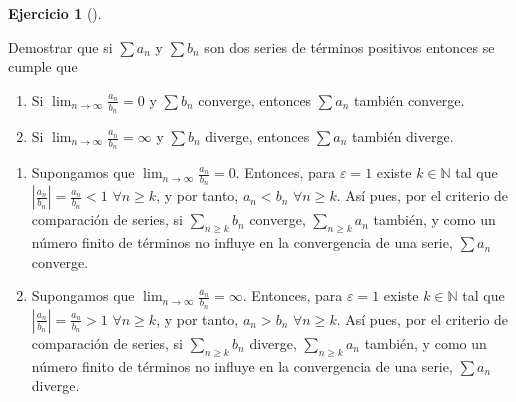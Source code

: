 \documentclass[
  spanish,
  a4paper,
]{scrreport}
\theoremstyle{definition}
\newtheorem{exercise}{Ejercicio}[chapter]
\theoremstyle{remark}
\begin{document}
\begin{exercise}[]\protect\hypertarget{exr-criterio-cociente}{}\label{exr-criterio-cociente}

Demostrar que si \(\sum a_n\) y \(\sum b_n\) son dos series de términos
positivos entonces se cumple que

\begin{enumerate}
\def\labelenumi{\alph{enumi}.}
\item
  Si \(\lim_{n\to\infty} \frac{a_n}{b_n} = 0\) y \(\sum b_n\) converge,
  entonces \(\sum a_n\) también converge.
\item
  Si \(\lim_{n\to\infty} \frac{a_n}{b_n} = \infty\) y \(\sum b_n\)
  diverge, entonces \(\sum a_n\) también diverge.
\end{enumerate}

\end{exercise}

\begin{tcolorbox}[enhanced jigsaw, arc=.35mm, bottomrule=.15mm, bottomtitle=1mm, breakable, colback=white, colbacktitle=quarto-callout-tip-color!10!white, colframe=quarto-callout-tip-color-frame, coltitle=black, left=2mm, leftrule=.75mm, opacityback=0, opacitybacktitle=0.6, rightrule=.15mm, title=\textcolor{quarto-callout-tip-color}{\faLightbulb}\hspace{0.5em}{Solución}, titlerule=0mm, toprule=.15mm, toptitle=1mm]

\begin{enumerate}
\def\labelenumi{\alph{enumi}.}
\item
  Supongamos que \(\lim_{n\to\infty} \frac{a_n}{b_n}=0\). Entonces, para
  \(\varepsilon=1\) existe \(k\in\mathbb{N}\) tal que
  \(\left|\frac{a_n}{b_n}\right|=\frac{a_n}{b_n}<1\)
  \(\forall n\geq k\), y por tanto, \(a_n<b_n\) \(\forall n\geq k\). Así
  pues, por el criterio de comparación de series, si
  \(\sum_{n\geq k} b_n\) converge, \(\sum_{n\geq k} a_n\) también, y
  como un número finito de términos no influye en la convergencia de una
  serie, \(\sum a_n\) converge.
\item
  Supongamos que \(\lim_{n\to\infty} \frac{a_n}{b_n}=\infty\). Entonces,
  para \(\varepsilon=1\) existe \(k\in\mathbb{N}\) tal que
  \(\left|\frac{a_n}{b_n}\right|=\frac{a_n}{b_n}>1\)
  \(\forall n\geq k\), y por tanto, \(a_n>b_n\) \(\forall n\geq k\). Así
  pues, por el criterio de comparación de series, si
  \(\sum_{n\geq k} b_n\) diverge, \(\sum_{n\geq k} a_n\) también, y como
  un número finito de términos no influye en la convergencia de una
  serie, \(\sum a_n\) diverge.
\end{enumerate}

\end{tcolorbox}
\end{document}
